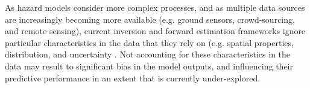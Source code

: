 

As hazard models consider more complex processes, and as multiple data sources are increasingly becoming more available (e.g. ground sensors, crowd-sourcing, and remote sensing), current inversion and forward estimation frameworks ignore particular characteristics in the data that they rely on (e.g. spatial properties, distribution, and uncertainty \citep{willcox2021imperative}. Not accounting for these characteristics in the data may result to significant bias in the model outputs, and influencing their predictive performance in an extent that is currently under-explored. 

